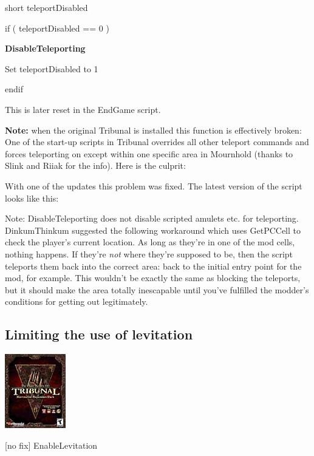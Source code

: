 short teleportDisabled

if ( teleportDisabled == 0 )

\textbf{DisableTeleporting}

Set teleportDisabled to 1

endif

This is later reset in the EndGame script.

\textbf{Note:} when the original Tribunal is installed this function is
effectively broken: One of the start-up scripts in Tribunal overrides
all other teleport commands and forces teleporting on except within one
specific area in Mournhold (thanks to Slink and Riiak for the info).
Here is the culprit:



With one of the updates this problem was fixed. The latest version of
the script looks like this:



Note: DisableTeleporting does not disable scripted amulets etc. for
teleporting. DinkumThinkum suggested the following workaround which uses
GetPCCell to check the player's current location. As long as they're in
one of the mod cells, nothing happens. If they're \emph{not} where
they're supposed to be, then the script teleports them back into the
correct area: back to the initial entry point for the mod, for example.
This wouldn't be exactly the same as blocking the teleports, but it
should make the area totally inescapable until you've fulfilled the
modder's conditions for getting out legitimately.



\hypertarget{limiting-the-use-of-levitation}{%
\subsection{Limiting the use of
levitation}\label{limiting-the-use-of-levitation}}

\includegraphics{media/image6.png}

{[}no fix{]} EnableLevitation

